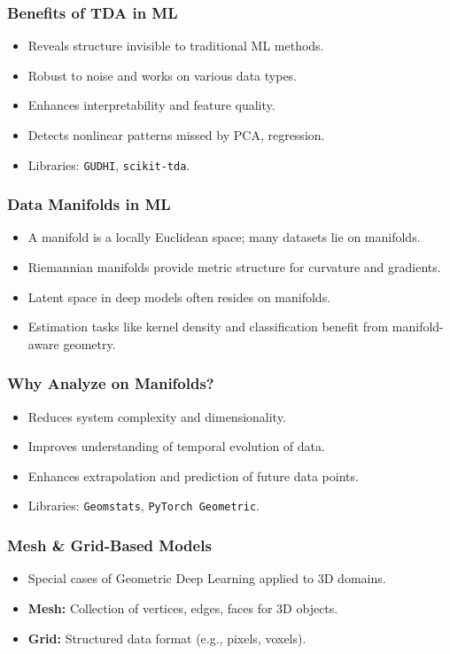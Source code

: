\begin{frame}[fragile]\frametitle{Benefits of TDA in ML}
  \begin{itemize}
    \item Reveals structure invisible to traditional ML methods.
    \item Robust to noise and works on various data types.
    \item Enhances interpretability and feature quality.
    \item Detects nonlinear patterns missed by PCA, regression.
    \item Libraries: \texttt{GUDHI}, \texttt{scikit-tda}.
  \end{itemize}
\end{frame}

\begin{frame}[fragile]\frametitle{Data Manifolds in ML}
  \begin{itemize}
    \item A manifold is a locally Euclidean space; many datasets lie on manifolds.
    \item Riemannian manifolds provide metric structure for curvature and gradients.
    \item Latent space in deep models often resides on manifolds.
    \item Estimation tasks like kernel density and classification benefit from manifold-aware geometry.
  \end{itemize}
\end{frame}

\begin{frame}[fragile]\frametitle{Why Analyze on Manifolds?}
  \begin{itemize}
    \item Reduces system complexity and dimensionality.
    \item Improves understanding of temporal evolution of data.
    \item Enhances extrapolation and prediction of future data points.
    \item Libraries: \texttt{Geomstats}, \texttt{PyTorch Geometric}.
  \end{itemize}
\end{frame}

\begin{frame}[fragile]\frametitle{Mesh \& Grid-Based Models}
  \begin{itemize}
    \item Special cases of Geometric Deep Learning applied to 3D domains.
    \item \textbf{Mesh:} Collection of vertices, edges, faces for 3D objects.
    \item \textbf{Grid:} Structured data format (e.g., pixels, voxels).
  \end{itemize}
\end{frame}


